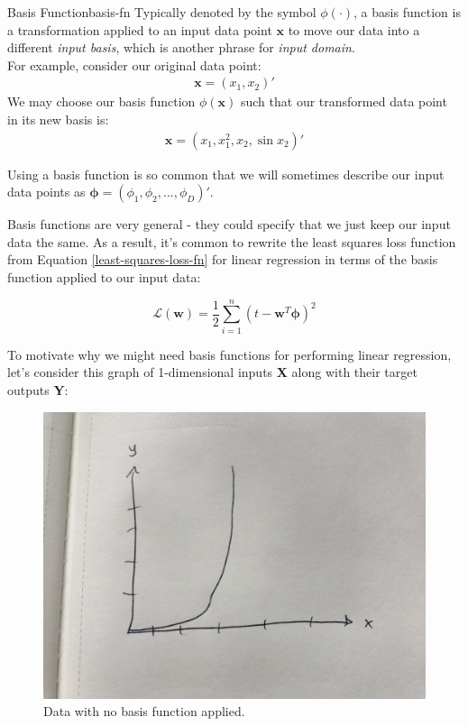 \begin{definition}{Basis Function}{basis-fn}
    Typically denoted by the symbol $\phi(\cdot)$, a basis function is a transformation applied to an input data point $\textbf{x}$ to move our data into a different \textit{input basis}, which is another phrase for \textit{input domain}. \\

    For example, consider our original data point:
    \begin{align*}
        \textbf{x} = (x_{1}, x_{2})'
    \end{align*}
    We may choose our basis function $\phi(\textbf{x})$ such that our transformed data point in its new basis is:
    \begin{align*}
        \textbf{x} = (x_{1}, x_{1}^2, x_{2}, \sin{x_{2}})'
    \end{align*}

    Using a basis function is so common that we will sometimes describe our input data points as $\boldsymbol{\phi} = (\phi_{1}, \phi_{2}, ..., \phi_{D})'$.
\end{definition}

Basis functions are very general - they could specify that we just keep our input data the same. As a result, it's common to rewrite the least squares loss function from Equation \ref{least-squares-loss-fn} for linear regression in terms of the basis function applied to our input data:

\begin{equation} \label{least-squares-loss-fn-w-basis}
    \mathcal{L}(\textbf{w}) = \frac{1}{2} \sum_{i=1}^{n} (t - \textbf{w}^{T}\boldsymbol{\phi})^2
\end{equation}

To motivate why we might need basis functions for performing linear regression, let's consider this graph of 1-dimensional inputs \textbf{X} along with their target outputs \textbf{Y}:

\begin{figure}[H]
    \centering
    \includegraphics[width=0.5\paperwidth]{../LinearRegression/fig/lin_reg_no_basis_fn.jpg}
    \caption{Data with no basis function applied.}
    \label{fig:lin-reg-no-basis-fn}
\end{figure}

